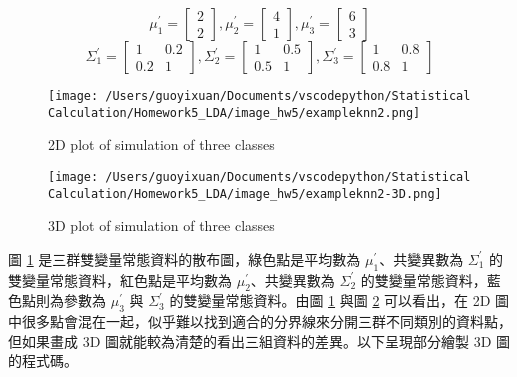 $$ \mu_1^{'} = \left[
            \begin{array}{clr}
                2  \\
                2 
            \end{array} \right] ,
            \mu_2^{'} = \left[
            \begin{array}{clr}
                4  \\
                1 
            \end{array} \right] ,
            \mu_3^{'} = \left[
            \begin{array}{clr}
                6  \\
                3 
            \end{array} \right] $$             
$$ \Sigma_1^{'} = \left[
            \begin{array}{clr}
                1 & 0.2  \\
                0.2 & 1
            \end{array} \right] ,
            \Sigma_2^{'} = \left[
            \begin{array}{clr}
                1 & 0.5  \\
                0.5 & 1 
            \end{array} \right] ,
            \Sigma_3^{'} = \left[
            \begin{array}{clr}
                1 & 0.8  \\
                0.8 & 1 
            \end{array} \right] $$    

\begin{figure}[H]
    \centering
        \texttt{[image: /Users/guoyixuan/Documents/vscodepython/Statistical Calculation/Homework5\_LDA/image\_hw5/exampleknn2.png]}
    \caption{2D plot of simulation of three classes}
    \label{fig:knn2D-three}
\end{figure} 

\begin{figure}[H]
    \centering
        \texttt{[image: /Users/guoyixuan/Documents/vscodepython/Statistical Calculation/Homework5\_LDA/image\_hw5/exampleknn2-3D.png]}
    \caption{3D plot of simulation of three classes}
    \label{fig:knn3D-three}
\end{figure} 

圖 \ref{fig:knn2D-three} 是三群雙變量常態資料的散布圖，綠色點是平均數為 $\mu_1^{'}$、共變異數為 $\Sigma_1^{'}$ 的雙變量常態資料，紅色點是平均數為 $\mu_2^{'}$、共變異數為 $\Sigma_2^{'}$ 的雙變量常態資料，藍色點則為參數為 $\mu_3^{'}$ 與 $\Sigma_3^{'}$ 的雙變量常態資料。由圖 \ref{fig:knn2D-three} 與圖 \ref{fig:knn3D-three} 可以看出，在 2D 圖中很多點會混在一起，似乎難以找到適合的分界線來分開三群不同類別的資料點，但如果畫成 3D 圖就能較為清楚的看出三組資料的差異。以下呈現部分繪製 3D 圖的程式碼。

